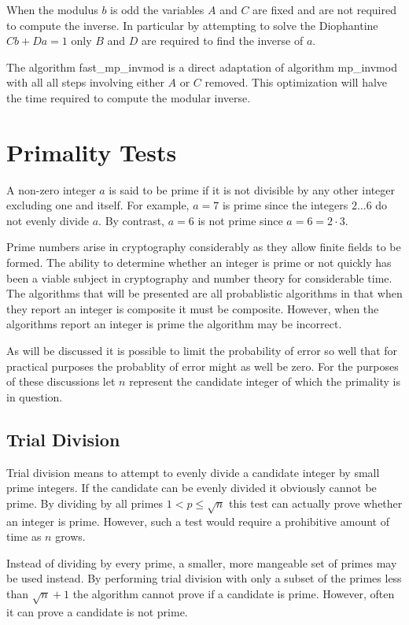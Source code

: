 \documentclass[b5paper]{book}
\begin{document}
When the modulus $b$ is odd the variables $A$ and $C$ are fixed and are not required to compute the inverse.  In particular by attempting to solve
the Diophantine $Cb + Da = 1$ only $B$ and $D$ are required to find the inverse of $a$.  

The algorithm fast\_mp\_invmod is a direct adaptation of algorithm mp\_invmod with all all steps involving either $A$ or $C$ removed.  This 
optimization will halve the time required to compute the modular inverse.

\section{Primality Tests}

A non-zero integer $a$ is said to be prime if it is not divisible by any other integer excluding one and itself.  For example, $a = 7$ is prime 
since the integers $2 \ldots 6$ do not evenly divide $a$.  By contrast, $a = 6$ is not prime since $a = 6 = 2 \cdot 3$. 

Prime numbers arise in cryptography considerably as they allow finite fields to be formed.  The ability to determine whether an integer is prime or
not quickly has been a viable subject in cryptography and number theory for considerable time.  The algorithms that will be presented are all
probablistic algorithms in that when they report an integer is composite it must be composite.  However, when the algorithms report an integer is
prime the algorithm may be incorrect.  

As will be discussed it is possible to limit the probability of error so well that for practical purposes the probablity of error might as 
well be zero.  For the purposes of these discussions let $n$ represent the candidate integer of which the primality is in question.

\subsection{Trial Division}

Trial division means to attempt to evenly divide a candidate integer by small prime integers.  If the candidate can be evenly divided it obviously
cannot be prime.  By dividing by all primes $1 < p \le \sqrt{n}$ this test can actually prove whether an integer is prime.  However, such a test
would require a prohibitive amount of time as $n$ grows.

Instead of dividing by every prime, a smaller, more mangeable set of primes may be used instead.  By performing trial division with only a subset
of the primes less than $\sqrt{n} + 1$ the algorithm cannot prove if a candidate is prime.  However, often it can prove a candidate is not prime.
\end{document}
